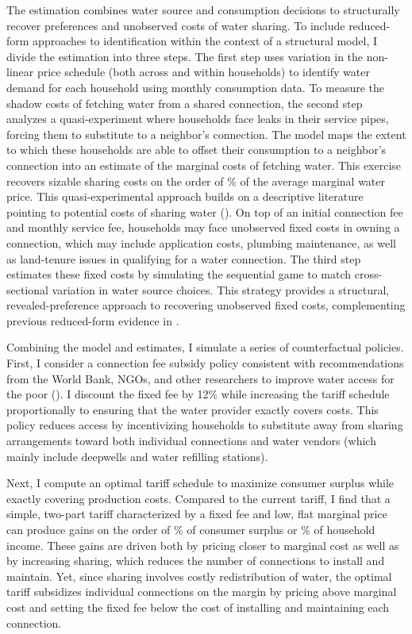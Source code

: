 \documentclass[12pt]{article}
\begin{document}
The estimation combines water source and consumption decisions to structurally recover preferences and unobserved costs of water sharing.  To include reduced-form approaches to identification within the context of a structural model, I divide the estimation into three steps.  The first step uses variation in the non-linear price schedule (both across and within households) to identify water demand for each household using monthly consumption data.  To measure the shadow costs of fetching water from a shared connection, the second step analyzes a quasi-experiment where households face leaks in their service pipes, forcing them to substitute to a neighbor's connection.  The model maps the extent to which these households are able to offset their consumption to a neighbor's connection into an estimate of the marginal costs of fetching water.  This exercise recovers sizable sharing costs on the order of \unskip\% of the average marginal water price.  This quasi-experimental approach builds on a descriptive literature pointing to potential costs of sharing water (\cite{whittington1992possible,nauges2006water}).  On top of an initial connection fee and monthly service fee, households may face unobserved fixed costs in owning a connection, which may include application costs, plumbing maintenance, as well as land-tenure issues in qualifying for a water connection.  The third step estimates these fixed costs by simulating the sequential game to match cross-sectional variation in water source choices.  This strategy provides a structural, revealed-preference approach to recovering unobserved fixed costs, complementing previous reduced-form evidence in \cite{devoto2012happiness}.

Combining the model and estimates, I simulate a series of counterfactual policies.  First, I consider a connection fee subsidy policy consistent with recommendations from the World Bank, NGOs, and other researchers to improve water access for the poor (\cite{komives2005water,wsup,jimenez2014factors,mcintosh2003asian}).  I discount the fixed fee by 12\% while increasing the tariff schedule proportionally to ensuring that the water provider exactly covers costs.  This policy reduces access by incentivizing households to substitute away from sharing arrangements toward both individual connections and water vendors (which mainly include deepwells and water refilling stations).  

Next, I compute an optimal tariff schedule to maximize consumer surplus while exactly covering production costs.  Compared to the current tariff, I find that a simple, two-part tariff characterized by a fixed fee and low, flat marginal price can produce gains on the order of \unskip\% of consumer surplus or \unskip\% of household income.  These gains are driven both by pricing closer to marginal cost as well as by increasing sharing, which reduces the number of connections to install and maintain.  Yet, since sharing involves costly redistribution of water, the optimal tariff subsidizes individual connections on the margin by pricing above marginal cost and setting the fixed fee below the cost of installing and maintaining each connection.
\end{document}

